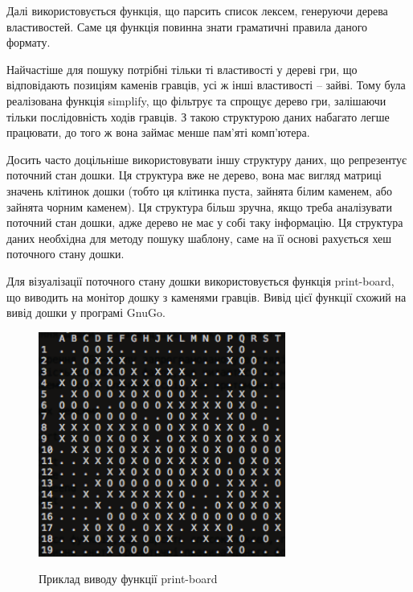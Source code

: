 Далі використовується функція, що парсить список лексем, генеруючи дерева властивостей. Саме ця функція повинна знати граматичні правила даного формату.

Найчастіше для пошуку потрібні тільки ті властивості у дереві гри, що відповідають позиціям каменів гравців, усі ж інші властивості -- зайві. Тому була реалізована функція simplify, що фільтрує та спрощує дерево гри, залішаючи тільки послідовність ходів гравців. З такою структурою даних набагато легше працювати, до того ж вона займає менше пам'яті комп'ютера.

Досить часто доцільніше використовувати іншу структуру даних, що репрезентує поточний стан дошки. Ця структура вже не дерево, вона має вигляд матриці значень клітинок дошки (тобто ця клітинка пуста, зайнята білим каменем, або зайнята чорним каменем). Ця структура більш зручна, якщо треба аналізувати поточний стан дошки, адже дерево не має у собі таку інформацію. Ця структура даних необхідна для методу пошуку шаблону, саме на її основі рахується хеш поточного стану дошки.

Для візуалізації поточного стану дошки використовується функція print-board, що виводить на монітор дошку з каменями гравців. Вивід цієї функції схожий на вивід дошки у програмі GnuGo.

\begin{figure}[H]
	\centering
	\caption{Приклад виводу функції print-board}
	\includegraphics[width=230pt]{print-board}
	\label{fig:print-board}
\end{figure}

